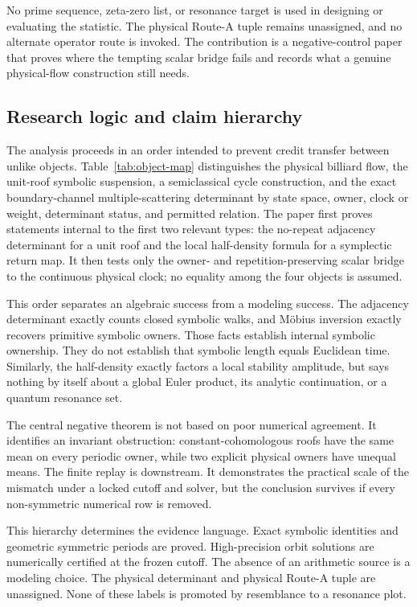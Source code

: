 \documentclass[11pt,a4paper]{article}
\theoremstyle{definition}
\theoremstyle{remark}
\begin{document}
No prime sequence, zeta-zero list, or resonance target is used in designing or evaluating the statistic. The physical Route-A tuple remains unassigned, and no alternate operator route is invoked. The contribution is a negative-control paper that proves where the tempting scalar bridge fails and records what a genuine physical-flow construction still needs.

\subsection{Research logic and claim hierarchy}

The analysis proceeds in an order intended to prevent credit transfer between unlike objects. Table~\ref{tab:object-map} distinguishes the physical billiard flow, the unit-roof symbolic suspension, a semiclassical cycle construction, and the exact boundary-channel multiple-scattering determinant by state space, owner, clock or weight, determinant status, and permitted relation. The paper first proves statements internal to the first two relevant types: the no-repeat adjacency determinant for a unit roof and the local half-density formula for a symplectic return map. It then tests only the owner- and repetition-preserving scalar bridge to the continuous physical clock; no equality among the four objects is assumed.

This order separates an algebraic success from a modeling success. The adjacency determinant exactly counts closed symbolic walks, and Möbius inversion exactly recovers primitive symbolic owners. Those facts establish internal symbolic ownership. They do not establish that symbolic length equals Euclidean time. Similarly, the half-density exactly factors a local stability amplitude, but says nothing by itself about a global Euler product, its analytic continuation, or a quantum resonance set.

The central negative theorem is not based on poor numerical agreement. It identifies an invariant obstruction: constant-cohomologous roofs have the same mean on every periodic owner, while two explicit physical owners have unequal means. The finite replay is downstream. It demonstrates the practical scale of the mismatch under a locked cutoff and solver, but the conclusion survives if every non-symmetric numerical row is removed.

This hierarchy determines the evidence language. Exact symbolic identities and geometric symmetric periods are proved. High-precision orbit solutions are numerically certified at the frozen cutoff. The absence of an arithmetic source is a modeling choice. The physical determinant and physical Route-A tuple are unassigned. None of these labels is promoted by resemblance to a resonance plot.
\end{document}
